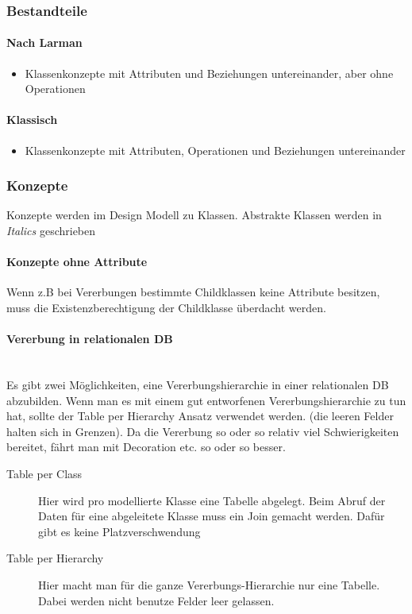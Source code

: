 \subsubsection{Bestandteile}
\paragraph{Nach Larman}
\begin{itemize}
	\item Klassenkonzepte mit Attributen und Beziehungen untereinander, aber ohne Operationen
\end{itemize}

\paragraph{Klassisch}
\begin{itemize}
	\item Klassenkonzepte mit Attributen, Operationen und Beziehungen untereinander
\end{itemize}

\subsubsection{Konzepte}
Konzepte werden im Design Modell zu Klassen. Abstrakte Klassen werden in \textit{Italics} geschrieben

\paragraph{Konzepte ohne Attribute}
Wenn z.B bei Vererbungen bestimmte Childklassen keine Attribute besitzen, muss die Existenzberechtigung der Childklasse überdacht werden.

\paragraph{Vererbung in relationalen DB} \hfill \\
Es gibt zwei Möglichkeiten, eine Vererbungshierarchie in einer relationalen DB abzubilden. Wenn man es mit einem gut entworfenen Vererbungshierarchie zu tun hat, sollte der Table per Hierarchy Ansatz verwendet werden. (die leeren Felder halten sich in Grenzen). Da die Vererbung so oder so relativ viel Schwierigkeiten bereitet, fährt man mit Decoration etc. so oder so besser.
\begin{description}
	\item[Table per Class] Hier wird pro modellierte Klasse eine Tabelle abgelegt. Beim Abruf der Daten für eine abgeleitete Klasse muss ein Join gemacht werden. Dafür gibt es keine Platzverschwendung
	\item[Table per Hierarchy] Hier macht man für die ganze Vererbungs-Hierarchie nur eine Tabelle. Dabei werden nicht benutze Felder leer gelassen.
\end{description}

